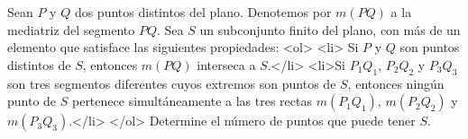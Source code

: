  Sean $P$ y $Q$ dos puntos distintos del plano. Denotemos por $m(PQ)$ a la mediatriz del segmento $PQ$. Sea $S$ un subconjunto finito del plano, con más de un elemento que satisface las siguientes propiedades:
 <ol>
    <li> Si $P$ y $Q$ son puntos distintos de $S$, entonces $m(PQ)$ interseca a $S$.</li>
    <li>Si $P_1Q_1$, $P_2Q_2$ y $P_3Q_3$ son tres segmentos diferentes cuyos extremos son puntos de $S$, entonces ningún punto de $S$ pertenece simultáneamente a las tres rectas $m(P_1Q_1)$, $m(P_2Q_2)$ y $m(P_3Q_3)$.</li>
</ol>
Determine el número de puntos que puede tener $S$. 